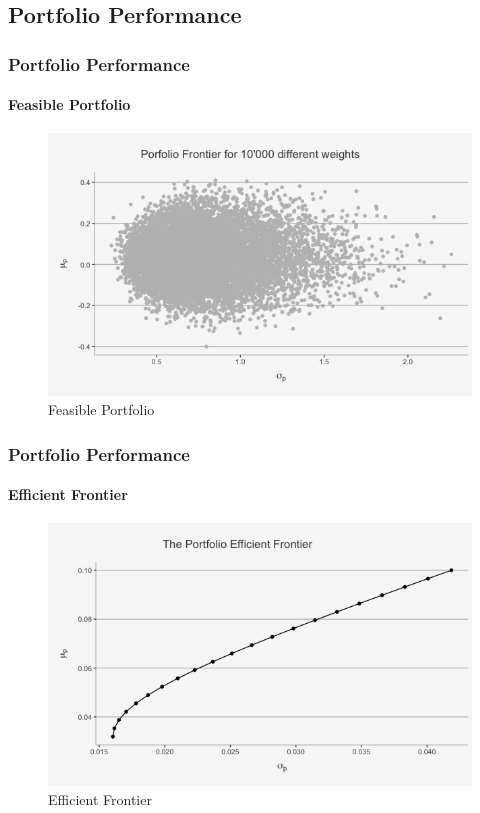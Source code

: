 \documentclass[
	11pt, %
]{beamer}
\begin{document}
\subsection{Portfolio Performance}
\begin{frame}
\frametitle{Portfolio Performance}
\framesubtitle{Feasible Portfolio}
\begin{figure}[H]
\includegraphics[width=0.8\linewidth]{attainable_port.png}
\caption{Feasible Portfolio}
\label{fig1}
\end{figure}
\end{frame}
\begin{frame}
\frametitle{Portfolio Performance}
\framesubtitle{Efficient Frontier}
\begin{figure}[H]
\includegraphics[width=0.8\linewidth]{EF.png}
\caption{Efficient Frontier}
\label{fig2}
\end{figure}
\end{frame}
\end{document}
